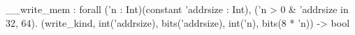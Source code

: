 __write_mem : forall ('n : Int)(constant 'addrsize : Int), ('n > 0 & 'addrsize in {32, 64}).
  (write_kind, int('addrsize), bits('addrsize), int('n), bits(8 * 'n)) -> bool